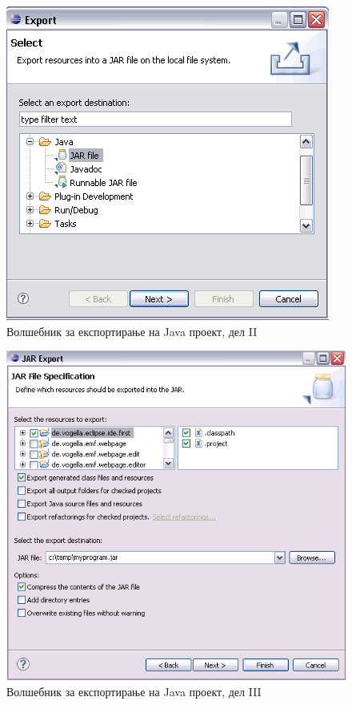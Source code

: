 \begin{figure}
\centering
\includegraphics[scale=.5]{images/export-jar}
\caption{Волшебник за експортирање на Java проект, дел II}
\end{figure}

\begin{figure}
\centering
\includegraphics[scale=.5]{images/wizzard}
\caption{Волшебник за експортирање на Java проект, дел III}
\end{figure}

